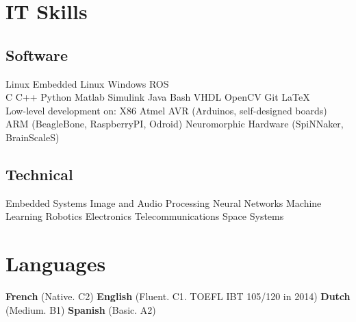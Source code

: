 \documentclass[a4paper]{deedy-resume} %
\begin{document}
\begin{minipage}[b]{0.47\linewidth}
	
	
	\section{IT Skills}
	\vspace{5pt}
	\subsection{Software}
	\vspace{2pt}
	Linux \textbullet{} Embedded Linux \textbullet{} Windows \textbullet{} ROS\\
	\vspace{3pt}
	C \textbullet{} C++ \textbullet{} Python \textbullet{} Matlab \textbullet{} Simulink \textbullet{} Java \textbullet{} Bash \textbullet{} VHDL \textbullet{} OpenCV \textbullet{} Git \textbullet{} \LaTeX\\
	\vspace{3pt}
	Low-level development on: X86 \textbullet{} Atmel AVR (Arduinos, self-designed boards) \textbullet{} ARM (BeagleBone, RaspberryPI, Odroid) \textbullet{} Neuromorphic Hardware (SpiNNaker, BrainScaleS)
	\vspace{5pt}
	
	\subsection{Technical}
	Embedded Systems \textbullet{}
	Image and Audio Processing \textbullet{} Neural Networks \textbullet{} Machine Learning \textbullet{} Robotics \textbullet{} Electronics \textbullet{} Telecommunications \textbullet{} Space Systems
\end{minipage}
\vspace{15pt}


\section{Languages}
\vspace{5pt}
\textbf{French} (Native. C2)   \textbullet{}  \textbf{English} (Fluent. C1. TOEFL IBT 105/120 in 2014)   \textbullet{}   \textbf{Dutch} (Medium. B1)   \textbullet{}   \textbf{Spanish} (Basic. A2)
\vspace{15pt}
\end{document}
